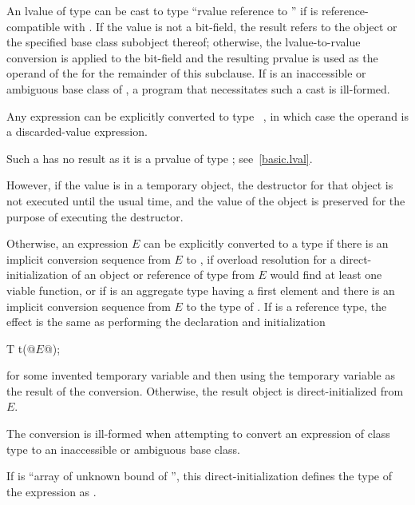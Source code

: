 \pnum
An lvalue
of type  can be cast to type ``rvalue
reference to '' if  is reference-compatible with
. If the value is not a bit-field,
the result refers to the object or the specified base class subobject
thereof; otherwise, the lvalue-to-rvalue conversion
is applied to the bit-field and the resulting prvalue is used as the
operand of the  for the remainder of this subclause.
If  is an inaccessible or
ambiguous base class of ,
a program that necessitates such a cast is ill-formed.

\pnum
Any expression can be explicitly converted to type \cv{}~,
in which case the operand is a discarded-value expression.
\begin{note}
Such a  has no result
as it is a prvalue of type ; see~\ref{basic.lval}.
\end{note}
\begin{note}
However, if the value is in a temporary
object, the destructor for that
object is
not executed until the usual time, and the value of the object is
preserved for the purpose of executing the destructor.
\end{note}

\pnum
Otherwise, an expression $E$ can be explicitly converted to a type 
if there is an implicit conversion sequence
from $E$ to ,
if overload resolution for a direct-initialization
of an object or reference of type  from $E$
would find at least one viable function, or
if  is an aggregate type
having a first element  and
there is an implicit conversion sequence
from $E$ to the type of .
If  is a reference type, the effect is
the same as performing the declaration and initialization
\begin{codeblock}
T t(@$E$@);
\end{codeblock}
for some invented temporary variable 
and then using the temporary variable as the result of the conversion.
Otherwise, the result object is direct-initialized from $E$.
\begin{note}
The conversion is ill-formed when attempting to convert an
expression of class type to an inaccessible or ambiguous base class.
\end{note}
\begin{note}
If  is ``array of unknown bound of '',
this direct-initialization defines the type of the expression as .
\end{note}


